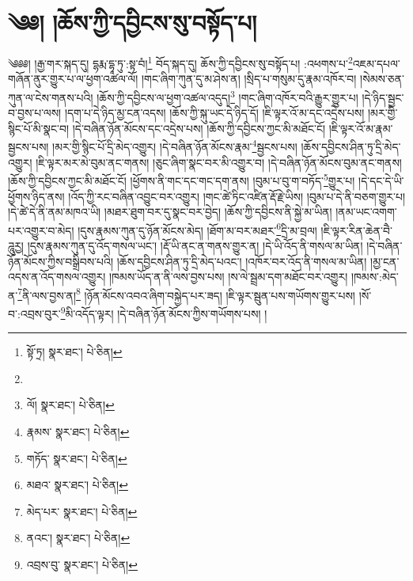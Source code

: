 \setcounter{footnote}{0} 
\chapter{༄༅། །ཆོས་ཀྱི་དབྱིངས་སུ་བསྟོད་པ།}༄༅༅། །རྒྱ་གར་སྐད་དུ། དྷརྨ་དྷཱ་ཏུ་:སྟ་བཾ།\footnote{སྟོ་ཏྲ།  སྣར་ཐང་།  པེ་ཅིན། } བོད་སྐད་དུ། ཆོས་ཀྱི་དབྱིངས་སུ་བསྟོད་པ། :འཕགས་པ་\footnote{}འཇམ་དཔལ་གཞོན་ནུར་གྱུར་པ་ལ་ཕྱག་འཚལ་ལོ། །གང་ཞིག་ཀུན་དུ་མ་ཤེས་ན། །སྲིད་པ་གསུམ་དུ་རྣམ་འཁོར་བ། །སེམས་ཅན་ཀུན་ལ་ངེས་གནས་པའི། །ཆོས་ཀྱི་དབྱིངས་ལ་ཕྱག་འཚལ་འདུད།\footnote{ལོ།  སྣར་ཐང་།  པེ་ཅིན། } །གང་ཞིག་འཁོར་བའི་རྒྱུར་གྱུར་པ། །དེ་ཉིད་སྦྱང་བ་བྱས་པ་ལས། །དག་པ་དེ་ཉིད་མྱ་ངན་འདས། །ཆོས་ཀྱི་སྐུ་ཡང་དེ་ཉིད་དོ། །ཇི་ལྟར་འོ་མ་དང་འདྲེས་པས། །མར་གྱི་སྙིང་པོ་མི་སྣང་བ། །དེ་བཞིན་ཉོན་མོངས་དང་འདྲེས་པས། །ཆོས་ཀྱི་དབྱིངས་ཀྱང་མི་མཐོང་ངོ། །ཇི་ལྟར་འོ་མ་རྣམ་སྦྱངས་པས། །མར་གྱི་སྙིང་པོ་དྲི་མེད་འགྱུར། །དེ་བཞིན་ཉོན་མོངས་རྣམ་\footnote{རྣམས་  སྣར་ཐང་།  པེ་ཅིན། }སྦྱངས་པས། །ཆོས་དབྱིངས་ཤིན་ཏུ་དྲི་མེད་འགྱུར། །ཇི་ལྟར་མར་མེ་བུམ་ནང་གནས། །ཅུང་ཞིག་སྣང་བར་མི་འགྱུར་བ། །དེ་བཞིན་ཉོན་མོངས་བུམ་ནང་གནས། །ཆོས་ཀྱི་དབྱིངས་ཀྱང་མི་མཐོང་ངོ། །ཕྱོགས་ནི་གང་དང་གང་དག་ནས། །བུམ་པ་བུ་ག་བཏོད་\footnote{གཏོད་  སྣར་ཐང་།  པེ་ཅིན། }གྱུར་པ། །དེ་དང་དེ་ཡི་ཕྱོགས་ཉིད་ནས། །འོད་ཀྱི་རང་བཞིན་འབྱུང་བར་འགྱུར། །གང་ཚེ་ཏིང་འཛིན་རྡོ་རྗེ་ཡིས། །བུམ་པ་དེ་ནི་བཅག་གྱུར་པ། །དེ་ཚེ་དེ་ནི་ནམ་མཁའ་ཡི། །མཐར་ཐུག་བར་དུ་སྣང་བར་བྱེད། །ཆོས་ཀྱི་དབྱིངས་ནི་སྐྱེ་མ་ཡིན། །ནམ་ཡང་འགག་པར་འགྱུར་བ་མེད། །དུས་རྣམས་ཀུན་དུ་ཉོན་མོངས་མེད། །ཐོག་མ་བར་མཐར་\footnote{མཐའ་  སྣར་ཐང་།  པེ་ཅིན། }དྲི་མ་བྲལ། །ཇི་ལྟར་རིན་ཆེན་བཻ་ཌཱུརྱ། །དུས་རྣམས་ཀུན་དུ་འོད་གསལ་ཡང་། །རྡོ་ཡི་ནང་ན་གནས་གྱུར་ན། །དེ་ཡི་འོད་ནི་གསལ་མ་ཡིན། །དེ་བཞིན་ཉོན་མོངས་ཀྱིས་བསྒྲིབས་པའི། །ཆོས་དབྱིངས་ཤིན་ཏུ་དྲི་མེད་པའང་། །འཁོར་བར་འོད་ནི་གསལ་མ་ཡིན། །མྱ་ངན་འདས་ན་འོད་གསལ་འགྱུར། །ཁམས་ཡོད་ན་ནི་ལས་བྱས་པས། །ས་ལེ་སྦྲམ་དག་མཐོང་བར་འགྱུར། །ཁམས་:མེད་ན་\footnote{མེད་པར་  སྣར་ཐང་།  པེ་ཅིན། }ནི་ལས་བྱས་ན།\footnote{ནའང་།  སྣར་ཐང་།  པེ་ཅིན། } །ཉོན་མོངས་འབའ་ཞིག་བསྐྱེད་པར་ཟད། །ཇི་ལྟར་སྦུན་པས་གཡོགས་གྱུར་པས། །སོ་བ་:འབྲས་བུར་\footnote{འབྲས་བུ་  སྣར་ཐང་།  པེ་ཅིན། }མི་འདོད་ལྟར། །དེ་བཞིན་ཉོན་མོངས་ཀྱིས་གཡོགས་པས། །
